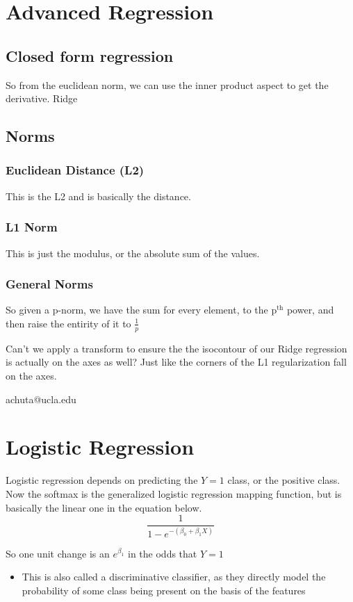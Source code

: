 \documentclass[12pt,a4paper,oneside,headinclude]{scrartcl}
\numberwithin{figure}{section}
\numberwithin{equation}{section}
\numberwithin{table}{section}
\renewenvironment{quote}{\begin{customblockquote}\list{}{\rightmargin=0em\leftmargin=0em}%
\item\relax\color{blockquote-text}\ignorespaces}{\unskip\unskip\endlist\end{customblockquote}}
\begin{document}
\section{Advanced Regression}
\label{sec:org60c8c0f}
\subsection{Closed form regression}
\label{sec:orgaec938b}
So from the euclidean norm, we can use the inner product aspect to get the
derivative. Ridge
\subsection{Norms}
\label{sec:org0387473}
\subsubsection{Euclidean Distance (L2)}
\label{sec:orgd6381f7}
This is the L2 and is basically the distance.
\subsubsection{L1 Norm}
\label{sec:orgfc3b75c}
This is just the modulus, or the absolute sum of the values.
\subsubsection{General Norms}
\label{sec:org84b5a85}
So given a p-norm, we have the sum for every element, to the p\(^{\text{th}}\) power, and
then raise the entirity of it to \(\frac{1}{p}\) 

\begin{quote}
Can't we apply a transform to ensure the the isocontour of our Ridge regression
is actually on the axes as well? Just like the corners of the L1 regularization
fall on the axes.
\end{quote}

achuta@ucla.edu
\section{Logistic Regression}
\label{sec:orgab94bf5}
Logistic regression depends on predicting the \(Y=1\) class, or the positive
class. Now the softmax is the generalized logistic regression mapping function,
but is basically the linear one in the equation below.
$$\frac{1}{1-e^{-(\beta_{0}+\beta_{1}X)}}$$

So one unit change is an \(e^{\beta_{1}}\) in the odds that \(Y=1\)
\begin{itemize}
\item This is also called a discriminative classifier, as they directly model the
probability of some class being present on the basis of the features
\end{itemize}
\end{document}

